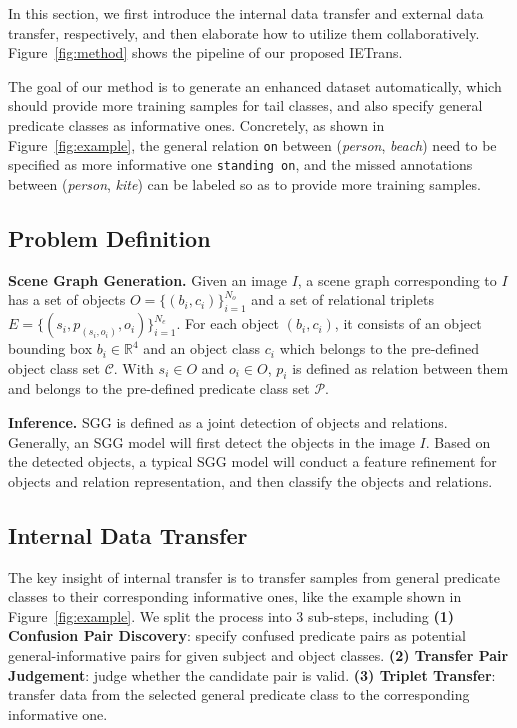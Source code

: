 \documentclass[runningheads]{llncs}
\begin{document}
In this section, we first introduce the internal data transfer and external data transfer, respectively, and then elaborate how to utilize them collaboratively. Figure~\ref{fig:method} shows the pipeline of our proposed IETrans.


The goal of our method is to generate an enhanced dataset automatically, which should provide more training samples for tail classes, and also specify general predicate classes as informative ones.
Concretely, as shown in Figure~\ref{fig:example}, the general relation \texttt{on} between (\textit{person}, \textit{beach}) need to be specified as more informative one \texttt{standing on}, and the missed annotations between (\textit{person}, \textit{kite}) can be labeled so as to provide more training samples.

\subsection{Problem Definition}


\smallskip
\noindent
\textbf{Scene Graph Generation.} Given an image $I$, a scene graph corresponding to $I$ has a set of objects $O=\{(b_i, c_i)\}_{i=1}^{N_o}$ and a set of relational triplets $E=\{(s_i, p_{(s_i, o_i)}, o_i)\}_{i=1}^{N_e}$. For each object $(b_i, c_i)$, it consists of an object bounding box $b_i \in \mathbb{R}^4$ and an object class $c_i$ which belongs to the pre-defined object class set $\mathcal{C}$. With $s_i \in O$ and $o_i \in O$, $p_i$ is defined as relation between them and belongs to the pre-defined predicate class set $\mathcal{P}$.


\smallskip
\noindent
\textbf{Inference.} SGG is defined as a joint detection of objects and relations.
Generally, an SGG model will first detect the objects in the image $I$.
Based on the detected objects, a typical SGG model will conduct a feature refinement for objects and relation representation, and then classify the objects and relations.

\subsection{Internal Data Transfer}
The key insight of internal transfer is to transfer samples from general predicate classes to their corresponding informative ones, like the example shown in Figure~\ref{fig:example}.
We split the process into 3 sub-steps, including \textbf{(1) Confusion Pair Discovery}: specify confused predicate pairs as potential general-informative pairs for given subject and object classes. 
\textbf{(2) Transfer Pair Judgement}: judge whether the candidate pair is valid. \textbf{(3) Triplet Transfer}: transfer data from the selected general predicate class to the corresponding informative one.
\end{document}
